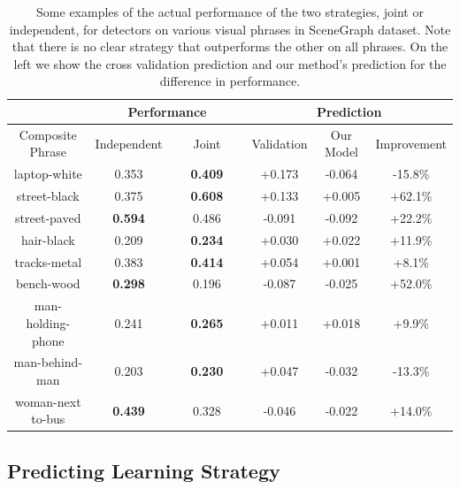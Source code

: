 \documentclass[runningheads]{llncs}
\newcommand{\Guy} [1]{{\color{RoyalBlue}{#1}}}
\begin{document}

\begin{table}[t]
\begin{center}
 \begin{tabular}{|c || c | c | c | c | c ||} 
 \hline
  & \multicolumn{2}{|c|}{Performance} & \multicolumn{3}{|c||}{Prediction}  \\ \hline
  Composite Phrase & Independent & ~~~Joint~~~  & Validation & Our Model & Improvement\\ [0.5ex]
 \hline\hline
 laptop-white & 0.353 & \textbf{0.409} & +0.173 & -0.064 & -15.8\%\\ 
 \hline
 street-black & 0.375 & \textbf{0.608} & +0.133 & +0.005 & +62.1\%\\
 \hline
 street-paved & \textbf{0.594} & 0.486 & -0.091 & -0.092 & +22.2\%\\
 \hline
 hair-black & 0.209 & \textbf{0.234} & +0.030 & +0.022 & +11.9\%\\
 \hline
 tracks-metal & 0.383 & \textbf{0.414} & +0.054 & +0.001 & +8.1\%\\
 \hline
 bench-wood & \textbf{0.298} & 0.196 & -0.087 & -0.025 & +52.0\%\\ 
 \hline
 \hline
 man-holding-phone & 0.241 & \textbf{0.265} & +0.011 & +0.018 & +9.9\%\\
 \hline
 man-behind-man & 0.203 & \textbf{0.230} & +0.047 & -0.032 & -13.3\%\\
 \hline
 woman-next to-bus & \textbf{0.439} & 0.328 & -0.046 &  -0.022 & +14.0\%\\
 \hline
\end{tabular}
\end{center}
\caption{Some examples of the actual performance of the two strategies, joint or independent, for detectors on various visual phrases in SceneGraph dataset. Note that there is no clear strategy that outperforms the other on all phrases. On the left we show the cross validation prediction and our method's prediction for the difference in performance.}
\label{tab:joint-ind}
\vspace*{-\baselineskip}
\vspace*{-\baselineskip}
\end{table}

\vspace{-0.05in}
\subsection{Predicting Learning Strategy}
\label{sec:learning_strategy}
\end{document}
